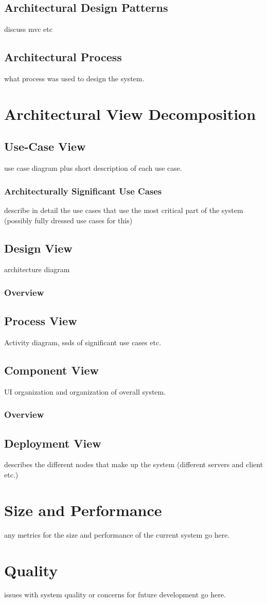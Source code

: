 \documentclass[11pt]{article}
\begin{document}
\subsection{Architectural Design Patterns}
discuss mvc etc
\subsection{Architectural Process}
what process was used to design the system.
\section{Architectural View Decomposition}
\subsection{Use-Case View}
use case diagram plus short description of each use case.
\subsubsection{Architecturally Significant Use Cases}
describe in detail the use cases that use the most critical part of the system (possibly fully dressed use cases for this)
\subsection{Design View}
architecture diagram
\subsubsection{Overview}
\subsection{Process View}
Activity diagram, ssds of significant use cases etc.
\subsection{Component View}
UI organization and organization of overall system.
\subsubsection{Overview}
\subsection{Deployment View}
describes the different nodes that make up the system (different servers and client etc.)
\section{Size and Performance}
any metrics for the size and performance of the current system go here.
\section{Quality}
issues with system quality or concerns for future development go here.
\end{document}
